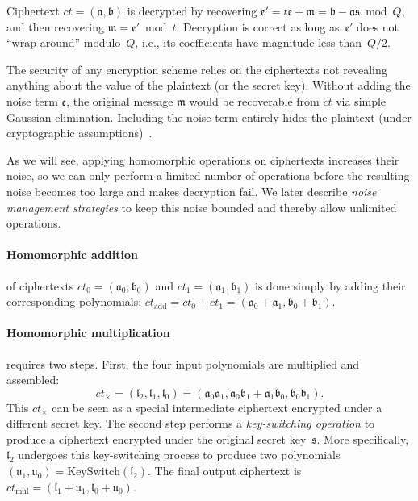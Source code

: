 Ciphertext $ct = (\mathfrak{a}, \mathfrak{b})$ is decrypted by
recovering
$\mathfrak{e}' = t\mathfrak{e} + \mathfrak{m} = \mathfrak{b} -
\mathfrak{a} \mathfrak{s} \bmod{Q}$, and then recovering
$\mathfrak{m} = \mathfrak{e}' \bmod t$.  Decryption is correct as long
as~$\mathfrak{e}'$ does not ``wrap around'' modulo~$Q$, i.e., its
coefficients have magnitude less than~$Q/2$.

The security of any encryption scheme relies on the ciphertexts not
revealing anything about the value of the plaintext (or the secret
key). Without adding the noise term $\mathfrak{e}$, the original message $\mathfrak{m}$ would be recoverable from $ct$ via simple Gaussian elimination.
Including the noise term entirely hides the plaintext (under cryptographic assumptions)~\cite{lyubashevsky:tact10:ideal}.

As we will see, applying homomorphic operations on ciphertexts increases their noise,
so we can only perform a limited number of
operations before the resulting noise becomes too
large %
and makes decryption fail.  We later describe \emph{noise management
  strategies} to keep this noise bounded and thereby allow unlimited
operations.

\paragraph{Homomorphic addition} of ciphertexts
$ct_0 = (\mathfrak{a}_{0}, \mathfrak{b}_{0})$ and
$ct_1 = (\mathfrak{a}_{1}, \mathfrak{b}_{1})$ is done simply by adding
their corresponding polynomials:
$ct_{\text{add}} = ct_0 + ct_1 = (\mathfrak{a}_0 + \mathfrak{a}_1,
\mathfrak{b}_0 + \mathfrak{b}_1)$.

\paragraph{Homomorphic multiplication} requires two steps.
First, the four input polynomials are multiplied and assembled:
\vspace{-2pt}
\begin{equation*}
  ct_{\times} = (\mathfrak{l}_2, \mathfrak{l}_1, \mathfrak{l}_0) = (\mathfrak{a}_0\mathfrak{a}_1,
  \mathfrak{a}_0\mathfrak{b}_1 + \mathfrak{a}_1 \mathfrak{b}_0,
  \mathfrak{b}_0\mathfrak{b}_1) .
\end{equation*}
This $ct_{\times}$ can be seen as a special intermediate ciphertext
encrypted under a different secret key. The second step performs a
\emph{key-switching operation} to produce a ciphertext encrypted under
the original secret key~$\mathfrak{s}$. More specifically,
$\mathfrak{l}_2$ undergoes this key-switching process
to produce two polynomials
$(\mathfrak{u}_1, \mathfrak{u}_0) =
\textrm{KeySwitch}(\mathfrak{l}_2)$.  The final output ciphertext is
$ct_{\text{mul}} = (\mathfrak{l}_1 + \mathfrak{u}_1, \mathfrak{l}_0 +
\mathfrak{u}_0)$.

